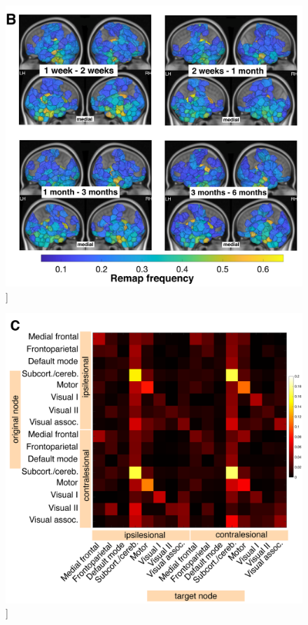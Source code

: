 \documentclass[phd,tocprelim]{cornell}
\renewcommand{\caption}[1]{\singlespacing\hangcaption{#1}\normalspacing}
\begin{document}
\begin{figure}[h!]
		\ContinuedFloat
		\captionsetup{labelformat=adja-page}
    \centering
    \includegraphics[width=\textwidth]{chapter1/Figure3B.png}
    \caption[]{}
\end{figure}
\null
\vfill
\clearpage
\null
\vfill
\begin{figure}[h!]
		\ContinuedFloat
		\captionsetup{labelformat=adja-page}
    \centering
    \includegraphics[width=\textwidth]{chapter1/Figure3C.png}
    \caption[]{}
\end{figure}
\end{document}
